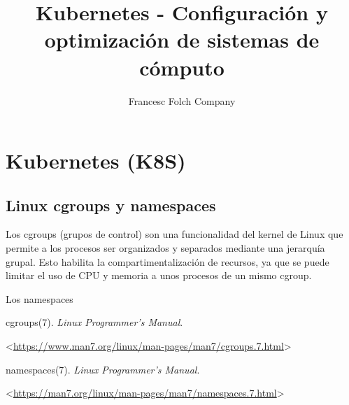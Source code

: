 \documentclass[]{article}
\title{Kubernetes - Configuración y optimización de sistemas de cómputo }
\author{Francesc Folch Company}
\begin{document}
\maketitle

\begin{abstract}

\end{abstract}

\section{Kubernetes (K8S)}

\subsection{Linux cgroups y namespaces}

Los cgroups (grupos de control)\cite{cgroups} son una funcionalidad del kernel de Linux que permite a los procesos ser organizados y separados mediante una jerarquía grupal. Esto habilita la compartimentalización de recursos, ya que se puede limitar el uso de CPU y memoria a unos procesos de un mismo cgroup.

Los namespaces \cite{namespaces}  
 

\begin{thebibliography}{10}
	cgroups(7). \textit{Linux Programmer's Manual}.
	
	<\url{https://www.man7.org/linux/man-pages/man7/cgroups.7.html}> 

namespaces(7). \textit{Linux Programmer's Manual}.

<\url{https://man7.org/linux/man-pages/man7/namespaces.7.html}> 


\end{thebibliography}
\end{document}
